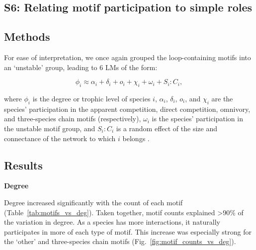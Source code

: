 \documentclass[12pt]{article}
\begin{document}
\begin{spacing}{2.0}
\clearpage


\section*{S6: Relating motif participation to simple roles}

	\subsection*{Methods}

        For ease of interpretation, we once again grouped the loop-containing motifs into an `unstable' group, leading to 6 LMs of the form:

        \begin{equation}
            \phi_{i} \approx \alpha_{i} + \delta_{i} + o_{i} + \chi_{i} + \omega_{i} + S_{i}:C_{i} ,
            \label{eq:degTL_motifs}
        \end{equation}

        where $\phi_{i}$ is the degree or trophic level of species $i$, $\alpha_{i}$, $\delta_{i}$, $o_{i}$, and $\chi_{i}$ are the species' participation in the apparent competition, direct competition, omnivory, and three-species chain motifs (respectively), $\omega_{i}$ is the species' participation in the unstable motif group, and $S_{i}:C_{i}$ is a random effect of the size and connectance of the network to which $i$ belongs .

	\subsection*{Results}

		\textbf{Degree}

			Degree increased significantly with the count of each motif (Table~\ref{tab:motifs_vs_deg}).
			Taken together, motif counts explained \textgreater90\% of the variation in degree. 
			As a species has more interactions, it naturally participates in more of each type of motif.
			This increase was especially strong for the `other' and three-species chain motifs (Fig.~\ref{fig:motif_counts_vs_deg}).



\end{spacing}
\end{document}
